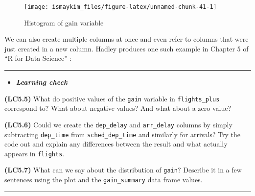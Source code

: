 \documentclass[]{tufte-book}
\newenvironment{Shaded}{\begin{snugshade}}{\end{snugshade}}
\newcommand{\KeywordTok}[1]{\textcolor[rgb]{0.13,0.29,0.53}{\textbf{{#1}}}}
\newcommand{\DataTypeTok}[1]{\textcolor[rgb]{0.13,0.29,0.53}{{#1}}}
\newcommand{\DecValTok}[1]{\textcolor[rgb]{0.00,0.00,0.81}{{#1}}}
\newcommand{\StringTok}[1]{\textcolor[rgb]{0.31,0.60,0.02}{{#1}}}
\newcommand{\NormalTok}[1]{{#1}}
\let\oldrule=\rule
\renewcommand{\rule}[1]{\oldrule{\linewidth}}
\newenvironment{rmdblock}[1]
  {\begin{shaded*}
  \begin{itemize}
  \renewcommand{\labelitemi}{
    \raisebox{-.7\height}[0pt][0pt]{
    }
  }
  \item
  }
  {
  \end{itemize}
  \end{shaded*}
  }
\newenvironment{learncheck}
  {\begin{rmdblock}{warning}}
  {\end{rmdblock}}
\begin{document}
\begin{figure}

{\centering \texttt{[image: ismaykim\_files/figure-latex/unnamed-chunk-41-1]} 

}

\caption[Histogram of gain variable]{Histogram of gain variable}\label{fig:unnamed-chunk-41}
\end{figure}

We can also create multiple columns at once and even refer to columns
that were just created in a new column. Hadley produces one such example
in Chapter 5 of ``R for Data Science'' \citep{rds2016}:

\begin{Shaded}
\end{Shaded}

\begin{center}\rule{0.5\linewidth}{\linethickness}\end{center}

\begin{learncheck}
\textbf{\emph{Learning check}}
\end{learncheck}

\textbf{(LC5.5)} What do positive values of the \texttt{gain} variable
in \texttt{flights\_plus} correspond to? What about negative values? And
what about a zero value?

\textbf{(LC5.6)} Could we create the \texttt{dep\_delay} and
\texttt{arr\_delay} columns by simply subtracting \texttt{dep\_time}
from \texttt{sched\_dep\_time} and similarly for arrivals? Try the code
out and explain any differences between the result and what actually
appears in \texttt{flights}.

\textbf{(LC5.7)} What can we say about the distribution of
\texttt{gain}? Describe it in a few sentences using the plot and the
\texttt{gain\_summary} data frame values.

\begin{center}\rule{0.5\linewidth}{\linethickness}\end{center}
\end{document}
